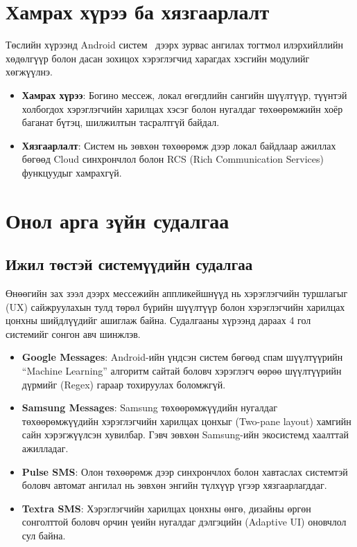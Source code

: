 \section{Хамрах хүрээ ба хязгаарлалт}
Төслийн хүрээнд Android систем~\cite{android_dev_docs} дээрх зурвас ангилах тогтмол илэрхийллийн хөдөлгүүр болон дасан зохицох хэрэглэгчид харагдах хэсгийн модулийг хөгжүүлнэ.
\begin{itemize}
    \item \textbf{Хамрах хүрээ}: Богино мессеж, локал өгөгдлийн сангийн шүүлтүүр, түүнтэй холбогдох хэрэглэгчийн харилцах хэсэг болон нугалдаг төхөөрөмжийн хоёр баганат бүтэц, шилжилтын тасралтгүй байдал.
    \item \textbf{Хязгаарлалт}: Систем нь зөвхөн төхөөрөмж дээр локал байдлаар ажиллах бөгөөд Cloud синхрончлол болон RCS (Rich Communication Services) функцуудыг хамрахгүй.
\end{itemize}

\section{Онол арга зүйн судалгаа}

\subsection{Ижил төстэй системүүдийн судалгаа}
Өнөөгийн зах зээл дээрх мессежийн аппликейшнүүд нь хэрэглэгчийн туршлагыг (UX) сайжруулахын тулд төрөл бүрийн шүүлтүүр болон хэрэглэгчийн харилцах цонхны шийдлүүдийг ашиглаж байна. Судалгааны хүрээнд дараах 4 гол системийг сонгон авч шинжлэв.

\begin{itemize}
    \item \textbf{Google Messages}: Android-ийн үндсэн систем бөгөөд спам шүүлтүүрийн ``Machine Learning'' алгоритм сайтай боловч хэрэглэгч өөрөө шүүлтүүрийн дүрмийг (Regex) гараар тохируулах боломжгүй.
    \item \textbf{Samsung Messages}: Samsung төхөөрөмжүүдийн нугалдаг төхөөрөмжүүдийн хэрэглэгчийн харилцах цонхыг (Two-pane layout) хамгийн сайн хэрэгжүүлсэн хувилбар. Гэвч зөвхөн Samsung-ийн экосистемд хаалттай ажилладаг.
    \item \textbf{Pulse SMS}: Олон төхөөрөмж дээр синхрончлох болон хавтаслах системтэй боловч автомат ангилал нь зөвхөн энгийн түлхүүр үгээр хязгаарлагддаг.
    \item \textbf{Textra SMS}: Хэрэглэгчийн харилцах цонхны өнгө, дизайны өргөн сонголттой боловч орчин үеийн нугалдаг дэлгэцийн (Adaptive UI) оновчлол сул байна.
\end{itemize}

